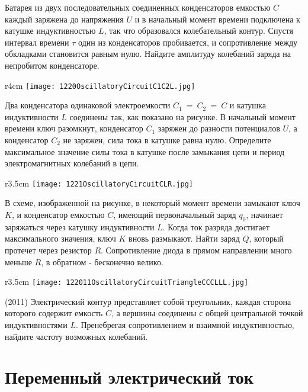 \AddProb Батарея из двух последовательных соединенных конденсаторов емкостью $C$ каждый заряжена до напряжения $U$ 
и в начальный момент времени подключена к катушке индуктивностью $L$, так что образовался колебательный контур. 
Спустя интервал времени $\tau$ один из конденсаторов пробивается, и сопротивление между обкладками становится равным нулю. 
Найдите амплитуду колебаний заряда на непробитом конденсаторе.

\begin{wrapfigure}{r}{4cm}
\texttt{[image: 1220OscillatoryCircuitC1C2L.jpg]}
\end{wrapfigure}

\AddProb Два конденсатора одинаковой электроемкости $C_1~=~C_2~=~C$ и катушка индуктивности $L$ соединены так, как показано на рисунке. 
В начальный момент времени ключ разомкнут, конденсатор $C_1$ заряжен до разности потенциалов $U$, а конденсатор $C_2$ не заряжен, 
сила тока в катушке равна нулю. Определите максимальное значение силы тока в катушке после замыкания цепи и период электромагнитных колебаний в цепи. 

\begin{wrapfigure}{r}{3.5cm}
\texttt{[image: 1221OscillatoryCircuitCLR.jpg]}
\end{wrapfigure}

\AddProb В схеме, изображенной на рисунке, в некоторый момент времени замыкают ключ $K$, и конденсатор емкостью $C$, 
имеющий первоначальный заряд $q_0$, начинает заряжаться через катушку индуктивности $L$. 
Когда ток разряда достигает максимального значения, ключ $K$ вновь размыкают. Найти заряд $Q$, который протечет через резистор $R$. 
Сопротивление диода в прямом направлении много меньше $R$, в обратном - бесконечно велико.

\begin{wrapfigure}{r}{3.5cm}
\texttt{[image: 122011OscillatoryCircuitTriangleCCCLLL.jpg]}
\end{wrapfigure}

\AddProb (2011) Электрический контур представляет собой треугольник, каждая сторона которого содержит емкость $C$, 
а вершины соединены с общей центральной точкой индуктивностями $L$. 
Пренебрегая сопротивлением и взаимной индуктивностью, найдите частоту возможных колебаний.


\section{Переменный электрический ток}

